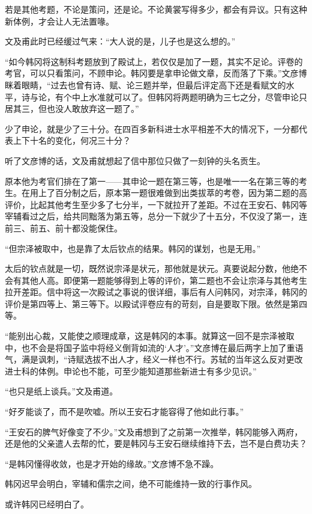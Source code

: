 若是其他考题，不论是策问，还是论。不论黄裳写得多少，都会有异议。只有这种新体例，才会让人无法置喙。

文及甫此时已经缓过气来：“大人说的是，儿子也是这么想的。”

“如今韩冈将这制科考题放到了殿试上，若仅仅是加了一题，其实不足论。评卷的考官，可以只看策问，不顾申论。韩冈要是拿申论做文章，反而落了下乘。”文彦博眯着眼睛，“过去也曾有诗、赋、论三题并举，但最后评定高下还是看赋文的水平，诗与论，有个中上水准就可以了。但韩冈将两题明确为三七之分，尽管申论只居其三，但也没人敢放弃这一题了。”

少了申论，就是少了三十分。在四百多新科进士水平相差不大的情况下，一分都代表上下十名的变化，何况三十分？

听了文彦博的话，文及甫就想起了信中那位只做了一刻钟的头名贡生。

原本他为考官们排在了第一——其申论一题在第三等，也是唯一一名在第三等的考生。在用上了百分制之后，原本第一题很难做到出类拔萃的考卷，因为第二题的高评价，比起其他考生至少多了七分半，一下就拉开了差距。不过在王安石、韩冈等宰辅看过之后，给共同黜落为第五等，总分一下就少了十五分，不仅没了第一，连前三、前五、前十都没能保住。

“但宗泽被取中，也是靠了太后钦点的结果。韩冈的谋划，也是无用。”

太后的钦点就是一切，既然说宗泽是状元，那他就是状元。真要说起分数，他绝不会有其他人高。即便第一题能够得到上等的评价，第二题也不会让宗泽与其他考生拉开差距。信中将这一次殿试之事说的很详细，事后有人问韩冈，对宗泽，韩冈的评价是第四等上、第三等下。以殿试评卷应有的苛刻，自是要取下限。依然是第四等。

“能别出心裁，又能使之顺理成章，这是韩冈的本事。就算这一回不是宗泽被取中，也不会是将国子监中将经义倒背如流的‘人才’。”文彦博在最后两字上加了重语气，满是讽刺，“诗赋选拔不出人才，经义一样也不行。苏轼的当年这么反对更改进士科的体例。申论也不能，可至少能知道那些新进士有多少见识。”

“也只是纸上谈兵。”文及甫道。

“好歹能谈了，而不是吹嘘。所以王安石才能容得了他如此行事。”

“王安石的脾气好像变了不少。”文及甫想到了之前第一次推举，韩冈能够入两府，还是他的父亲遣人去帮的忙，要是韩冈与王安石继续维持下去，岂不是白费功夫？

“是韩冈懂得收敛，也是才开始的缘故。”文彦博不急不躁。

韩冈迟早会明白，宰辅和儒宗之间，绝不可能维持一致的行事作风。

或许韩冈已经明白了。

